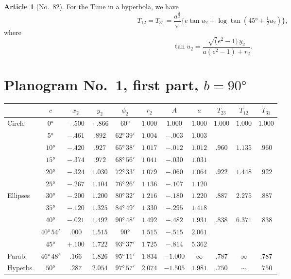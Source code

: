 \documentclass[11pt,a4paper]{article}
\theoremstyle{definition}
\newtheorem{art}{Article}
\begin{document}
\begin{art}[No.~82]
For the Time in a hyperbola, we have
\[
T_{12} = T_{31} = \frac{a^{\frac{3}{2}}}{\pi}\{e\tan u_2 + \log \tan(45° + \tfrac{1}{2}u_2)\},
\]
where
\[
\tan u_2 = \frac{\surd(e^2 - 1)\, y_2}{a(e^2 - 1) + r_2}.
\]
\end{art}


\newpage
\section*{Planogram No.~1, first part, $b = 90°$}

\begin{center}
\small
\begin{tabular}{|l|c|c|c|c|c|c|c|c|c|c|}
\hline
 & $c$ & $x_2$ & $y_2$ & $\phi_2$ & $r_2$ & $A$ & $a$ & $T_{23}$ & $T_{12}$ & $T_{31}$ \\
\hline
Circle & $0°$ & $-.500$ & $+.866$ & $60°$ & $1.000$ & $1.000$ & $1.000$ & $1.000$ & $1.000$ & $1.000$ \\
 & $5°$ & $-.461$ & $.892$ & $62°\,39'$ & $1.004$ & $-.003$ & $1.003$ & & & \\
 & $10°$ & $-.420$ & $.927$ & $65°\,38'$ & $1.017$ & $-.012$ & $1.012$ & $.960$ & $1.135$ & $.960$ \\
 & $15°$ & $-.374$ & $.972$ & $68°\,56'$ & $1.041$ & $-.030$ & $1.031$ & & & \\
 & $20°$ & $-.324$ & $1.030$ & $72°\,33'$ & $1.079$ & $-.060$ & $1.064$ & $.922$ & $1.448$ & $.922$ \\
 & $25°$ & $-.267$ & $1.104$ & $76°\,26'$ & $1.136$ & $-.107$ & $1.120$ & & & \\
\hline
Ellipses & $30°$ & $-.200$ & $1.200$ & $80°\,32'$ & $1.216$ & $-.180$ & $1.220$ & $.887$ & $2.275$ & $.887$ \\
 & $35°$ & $-.120$ & $1.325$ & $84°\,49'$ & $1.330$ & $-.295$ & $1.418$ & & & \\
 & $40°$ & $-.021$ & $1.492$ & $90°\,48'$ & $1.492$ & $-.482$ & $1.931$ & $.838$ & $6.371$ & $.838$ \\
 & $40°\,54'$ & $.000$ & $1.515$ & $90°$ & $1.515$ & $-.515$ & $2.061$ & & & \\
 & $45°$ & $+.100$ & $1.722$ & $93°\,37'$ & $1.725$ & $-.814$ & $5.362$ & & & \\
\hline
Parab. & $46°\,48'$ & $.166$ & $1.826$ & $95°\,11'$ & $1.834$ & $-1.000$ & $\infty$ & $.787$ & $\infty$ & $.787$ \\
\hline
Hyperbs. & $50°$ & $.287$ & $2.054$ & $97°\,57'$ & $2.074$ & $-1.505$ & $1.981$ & $.750$ & $\sim$ & $.750$ \\

\end{tabular}
\end{center}
\end{document}
